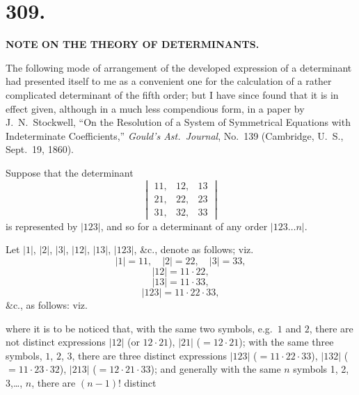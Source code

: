 \documentclass[11pt,a4paper]{article}
\begin{document}
\section*{309.}

\begin{center}
\textbf{NOTE ON THE THEORY OF DETERMINANTS.}
\end{center}

\bigskip


\bigskip

The following mode of arrangement of the developed expression of a determinant had presented itself to me as a convenient one for the calculation of a rather complicated determinant of the fifth order; but I have since found that it is in effect given, although in a much less compendious form, in a paper by J.~N.~Stockwell, ``On the Resolution of a System of Symmetrical Equations with Indeterminate Coefficients,'' \textit{Gould's Ast.\ Journal}, No.~139 (Cambridge, U.~S., Sept.\ 19, 1860).

\medskip

Suppose that the determinant
\[
\begin{vmatrix}
11, & 12, & 13 \\
21, & 22, & 23 \\
31, & 32, & 33
\end{vmatrix}
\]
is represented by $|123|$, and so for a determinant of any order $|123\ldots n|$.

\medskip

Let $|1|$, $|2|$, $|3|$, $|12|$, $|13|$, $|123|$, \&c., denote as follows; viz.\
\[
|1|=11, \quad |2|=22, \quad |3|=33,
\]
\[
|12|=11\cdot 22,
\]
\[
|13|=11\cdot 33,
\]
\[
|123|=11\cdot 22\cdot 33,
\]
\&c., as follows: viz.

\noindent where it is to be noticed that, with the same two symbols, e.g.\ $1$ and $2$, there are not distinct expressions $|12|$ (or $12\cdot 21$), $|21|$ ($=12\cdot 21$); with the same three symbols, $1$, $2$, $3$, there are three distinct expressions $|123|$ ($=11\cdot 22\cdot 33$), $|132|$ ($=11\cdot 23\cdot 32$), $|213|$ ($=12\cdot 21\cdot 33$); and generally with the same $n$ symbols 1, 2, 3,\ldots, $n$, there are $(n-1)!$ distinct
\clearpage
\end{document}

